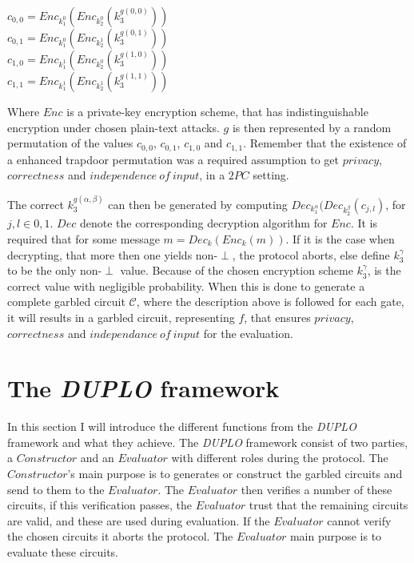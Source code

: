 \documentclass[twoside,11pt,openright]{report}
\newcommand{\DUPLO}{\textit{DUPLO} }
\begin{document}
\begin{center}
    $c_{0,0} = Enc_{k^0_1}(Enc_{k^0_2}(k^{g(0,0)}_3))$    \\
    $c_{0,1} = Enc_{k^0_1}(Enc_{k^1_2}(k^{g(0,1)}_3))$    \\
    $c_{1,0} = Enc_{k^1_1}(Enc_{k^0_2}(k^{g(1,0)}_3))$    \\
    $c_{1,1} = Enc_{k^1_1}(Enc_{k^1_2}(k^{g(1,1)}_3))$    \\
\end{center}

Where $Enc$ is a private-key encryption scheme, that has indistinguishable encryption under chosen plain-text attacks. $g$ is then represented by a random permutation of the values $c_{0,0}$, $c_{0,1}$, $c_{1,0}$ and $c_{1,1}$. Remember that the existence of a enhanced trapdoor permutation was a required assumption to get $privacy$, $correctness$ and $independence~of~input$, in a $2PC$ setting.

The correct $k^{g(\alpha,\beta)}_3$ can then be generated by computing $Dec_{k^\alpha_1}(Dec_{k^\beta_2}(c_{j,l})$, for $j,l\in{0,1}$. $Dec$ denote the corresponding decryption algorithm for $Enc$. It is required that for some message $m=Dec_k(Enc_k(m))$. If it is the case when decrypting, that more then one yields non-$\perp$, the protocol aborts, else define $k^\gamma_3$ to be the only non-$\perp$ value. Because of the chosen encryption scheme $k^\gamma_3$, is the correct value with negligible probability. When this is done to generate a complete garbled circuit $\mathcal{C}$, where the description above is followed for each gate, it will results in a garbled circuit, representing $f$, that ensures $privacy$, $correctness$ and $independance ~of~input$ for the evaluation.


\section{The \DUPLO framework}
\label{sec:duplo_framework}
In this section I will introduce the different functions from the \DUPLO framework and what they achieve. The \DUPLO framework consist of two parties, a $Constructor$ and an $Evaluator$ with different roles during the protocol. The $Constructor$'s main purpose is to generates or construct the garbled circuits and send to them to the $Evaluator$. The $Evaluator$ then verifies a number of these circuits, if this verification passes, the $Evaluator$ trust that the remaining circuits are valid, and these are used during evaluation. If the $Evaluator$ cannot verify the chosen circuits it aborts the protocol. The $Evaluator$ main purpose is to evaluate these circuits.
\end{document}
